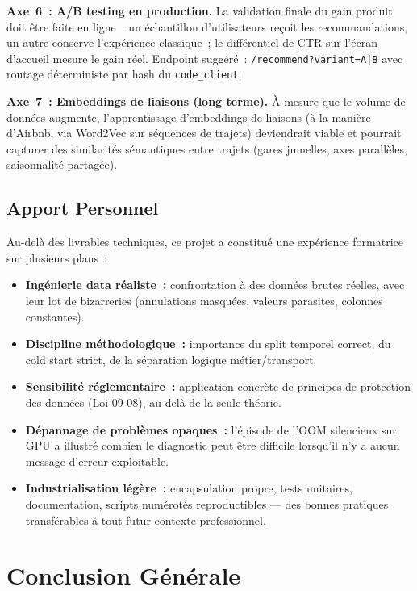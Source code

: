 \documentclass[11pt, a4paper]{article}
\begin{document}
\textbf{Axe~6~: A/B testing en production.} La validation finale du
gain produit doit être faite en ligne~: un échantillon d'utilisateurs
reçoit les recommandations, un autre conserve l'expérience classique~;
le différentiel de CTR sur l'écran d'accueil mesure le gain réel.
Endpoint suggéré~: \texttt{/recommend?variant=A|B} avec routage
déterministe par hash du \texttt{code\_client}.

\textbf{Axe~7~: Embeddings de liaisons (long terme).} À mesure que le
volume de données augmente, l'apprentissage d'embeddings de liaisons
(à la manière d'Airbnb, via Word2Vec sur séquences de trajets) deviendrait
viable et pourrait capturer des similarités sémantiques entre trajets
(gares jumelles, axes parallèles, saisonnalité partagée).

\subsection{Apport Personnel}

Au-delà des livrables techniques, ce projet a constitué une expérience
formatrice sur plusieurs plans~:
\begin{itemize}
\item \textbf{Ingénierie data réaliste~:} confrontation à des données
    brutes réelles, avec leur lot de bizarreries (annulations
    masquées, valeurs parasites, colonnes constantes).
\item \textbf{Discipline méthodologique~:} importance du split temporel
    correct, du cold start strict, de la séparation logique
    métier/transport.
\item \textbf{Sensibilité réglementaire~:} application concrète de
    principes de protection des données (Loi 09-08), au-delà de la
    seule théorie.
\item \textbf{Dépannage de problèmes opaques~:} l'épisode de l'OOM
    silencieux sur GPU a illustré combien le diagnostic peut être
    difficile lorsqu'il n'y a aucun message d'erreur exploitable.
\item \textbf{Industrialisation légère~:} encapsulation propre,
    tests unitaires, documentation, scripts numérotés
    reproductibles --- des bonnes pratiques transférables à tout futur
    contexte professionnel.
\end{itemize}

\newpage
\section{Conclusion Générale}
\end{document}
